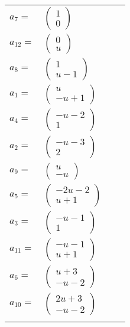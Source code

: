 \documentclass[1p]{elsarticle_modified}
\theoremstyle{definition}
\begin{document}
\begin{tabular}{m{7pt} m{180pt} m{7pt} m{180pt} }
\flushright $a_{7}=$&$\begin{pmatrix}1\\0\end{pmatrix}$ \\
\flushright $a_{12}=$&$\begin{pmatrix}0\\u\end{pmatrix}$ \\
\flushright $a_{8}=$&$\begin{pmatrix}1\\u-1\end{pmatrix}$ \\
\flushright $a_{1}=$&$\begin{pmatrix}u\\- u+1\end{pmatrix}$ \\
\flushright $a_{4}=$&$\begin{pmatrix}- u-2\\1\end{pmatrix}$ \\
\flushright $a_{2}=$&$\begin{pmatrix}- u-3\\2\end{pmatrix}$ \\
\flushright $a_{9}=$&$\begin{pmatrix}u\\- u\end{pmatrix}$ \\
\flushright $a_{5}=$&$\begin{pmatrix}-2 u-2\\u+1\end{pmatrix}$ \\
\flushright $a_{3}=$&$\begin{pmatrix}- u-1\\1\end{pmatrix}$ \\
\flushright $a_{11}=$&$\begin{pmatrix}- u-1\\u+1\end{pmatrix}$ \\
\flushright $a_{6}=$&$\begin{pmatrix}u+3\\- u-2\end{pmatrix}$ \\
\flushright $a_{10}=$&$\begin{pmatrix}2 u+3\\- u-2\end{pmatrix}$\\&\end{tabular}
\end{document}
